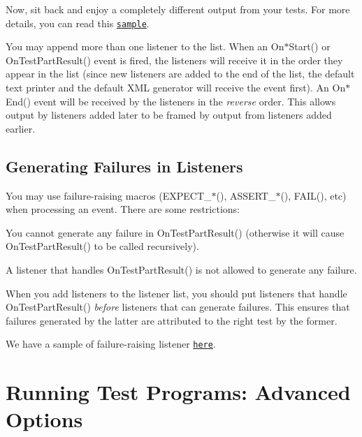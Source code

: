 Now, sit back and enjoy a completely different output from your tests. For more details, you can read this \href{../samples/sample9_unittest.cc}{\tt sample}.

You may append more than one listener to the list. When an {\ttfamily On$\ast$\+Start()} or {\ttfamily On\+Test\+Part\+Result()} event is fired, the listeners will receive it in the order they appear in the list (since new listeners are added to the end of the list, the default text printer and the default X\+ML generator will receive the event first). An {\ttfamily On$\ast$\+End()} event will be received by the listeners in the {\itshape reverse} order. This allows output by listeners added later to be framed by output from listeners added earlier.

\subsection*{Generating Failures in Listeners}

You may use failure-\/raising macros ({\ttfamily E\+X\+P\+E\+C\+T\+\_\+$\ast$()}, {\ttfamily A\+S\+S\+E\+R\+T\+\_\+$\ast$()}, {\ttfamily F\+A\+I\+L()}, etc) when processing an event. There are some restrictions\+:


\begin{DoxyEnumerate}
\item You cannot generate any failure in {\ttfamily On\+Test\+Part\+Result()} (otherwise it will cause {\ttfamily On\+Test\+Part\+Result()} to be called recursively).
\end{DoxyEnumerate}
\begin{DoxyEnumerate}
\item A listener that handles {\ttfamily On\+Test\+Part\+Result()} is not allowed to generate any failure.
\end{DoxyEnumerate}

When you add listeners to the listener list, you should put listeners that handle {\ttfamily On\+Test\+Part\+Result()} {\itshape before} listeners that can generate failures. This ensures that failures generated by the latter are attributed to the right test by the former.

We have a sample of failure-\/raising listener \href{../samples/sample10_unittest.cc}{\tt here}.

\section*{Running Test Programs\+: Advanced Options}

